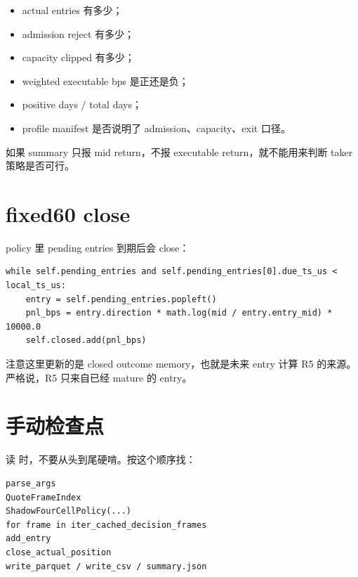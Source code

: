 \begin{itemize}[leftmargin=2em]
  \item actual entries 有多少；
  \item admission reject 有多少；
  \item capacity clipped 有多少；
  \item weighted executable bps 是正还是负；
  \item positive days / total days；
  \item profile manifest 是否说明了 admission、capacity、exit 口径。
\end{itemize}

如果 summary 只报 mid return，不报 executable return，就不能用来判断 taker 策略是否可行。

\section{fixed60 close}

policy 里 pending entries 到期后会 close：

\begin{lstlisting}
while self.pending_entries and self.pending_entries[0].due_ts_us < local_ts_us:
    entry = self.pending_entries.popleft()
    pnl_bps = entry.direction * math.log(mid / entry.entry_mid) * 10000.0
    self.closed.add(pnl_bps)
\end{lstlisting}

注意这里更新的是 closed outcome memory，也就是未来 entry 计算 R5 的来源。严格说，R5 只来自已经 mature 的 entry。

\section{手动检查点}

读  时，不要从头到尾硬啃。按这个顺序找：

\begin{lstlisting}
parse_args
QuoteFrameIndex
ShadowFourCellPolicy(...)
for frame in iter_cached_decision_frames
add_entry
close_actual_position
write_parquet / write_csv / summary.json
\end{lstlisting}

